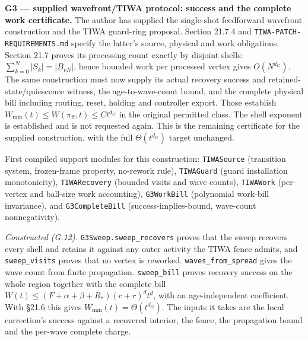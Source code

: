 \documentclass[
]{article}
\begin{document}
\textbf{G3 --- supplied wavefront/TIWA protocol: success and the
complete work certificate.} The author has supplied the single-shot
feedforward wavefront construction and the TIWA guard-ring proposal.
Section 21.7.4 and
\texttt{T\allowbreak{}I\allowbreak{}W\allowbreak{}A\allowbreak{}-\allowbreak{}P\allowbreak{}A\allowbreak{}T\allowbreak{}C\allowbreak{}H\allowbreak{}-\allowbreak{}R\allowbreak{}E\allowbreak{}Q\allowbreak{}U\allowbreak{}I\allowbreak{}R\allowbreak{}E\allowbreak{}M\allowbreak{}E\allowbreak{}N\allowbreak{}T\allowbreak{}S\allowbreak{}.\allowbreak{}m\allowbreak{}d}
specify the latter's source, physical and work obligations. Section 21.7
proves its processing count exactly by disjoint shells:
\(\sum_{k=0}^N|S_k|=|B_{vN}|\), hence bounded work per processed vertex
gives \(O(N^{d_G})\). The same construction must now supply its actual
recovery success and
r\allowbreak{}e\allowbreak{}t\allowbreak{}a\allowbreak{}i\allowbreak{}n\allowbreak{}e\allowbreak{}d\allowbreak{}-\allowbreak{}s\allowbreak{}t\allowbreak{}a\allowbreak{}t\allowbreak{}e\allowbreak{}/\allowbreak{}q\allowbreak{}u\allowbreak{}i\allowbreak{}e\allowbreak{}s\allowbreak{}c\allowbreak{}e\allowbreak{}n\allowbreak{}c\allowbreak{}e
witness, the age-to-wave-count bound, and the complete physical bill
including routing, reset, holding and controller export. Those establish
\(W_{\min}(t)\le W(\pi_{\mathrm{ff}},t)\le Ct^{d_G}\) in the original
permitted class. The shell exponent is established and is not requested
again. This is the remaining certificate for the supplied construction,
with the full \(\Theta(t^{d_G})\) target unchanged.

First compiled support modules for this construction:
\texttt{TIWASource} (transition system, frozen-frame property, no-rework
rule), \texttt{TIWAGuard} (guard installation monotonicity),
\texttt{TIWARecovery} (bounded visits and wave counts),
\texttt{TIWAWork} (per-vertex and ball-size work accounting),
\texttt{G3WorkBill} (polynomial work-bill invariance), and
\texttt{G3CompleteBill} (success-implies-bound, wave-count
nonnegativity).

\emph{Constructed (G.12).}
\texttt{G\allowbreak{}3\allowbreak{}S\allowbreak{}w\allowbreak{}e\allowbreak{}e\allowbreak{}p\allowbreak{}.\allowbreak{}s\allowbreak{}w\allowbreak{}e\allowbreak{}e\allowbreak{}p\allowbreak{}\_\allowbreak{}r\allowbreak{}e\allowbreak{}c\allowbreak{}o\allowbreak{}v\allowbreak{}e\allowbreak{}r\allowbreak{}s}
proves that the sweep recovers every shell and retains it against any
outer activity the TIWA fence admits, and \texttt{sweep\_visits} proves
that no vertex is reworked.
\texttt{w\allowbreak{}a\allowbreak{}v\allowbreak{}e\allowbreak{}s\allowbreak{}\_\allowbreak{}f\allowbreak{}r\allowbreak{}o\allowbreak{}m\allowbreak{}\_\allowbreak{}s\allowbreak{}p\allowbreak{}r\allowbreak{}e\allowbreak{}a\allowbreak{}d}
gives the wave count from finite propagation. \texttt{sweep\_bill}
proves recovery success on the whole region together with the complete
bill \(W(t)\le(F+\alpha+\beta+R_*)(c+r)^{d}t^{d}\), with an
age-independent coefficient. With §21.6 this gives
\(W_{\min}(t)=\Theta(t^{d_G})\). The inputs it takes are the local
correction's success against a recovered interior, the fence, the
propagation bound and the per-wave complete charge.
\end{document}
